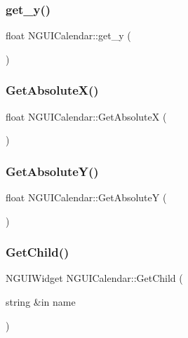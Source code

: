\hypertarget{class_n_g_u_i_calendar_a37957bdc2195ee36b2734cfea183a854}{}\label{class_n_g_u_i_calendar_a37957bdc2195ee36b2734cfea183a854} 
\subsubsection{\texorpdfstring{get\+\_\+y()}{get\_y()}}
{\footnotesize\ttfamily float N\+G\+U\+I\+Calendar\+::get\+\_\+y (\begin{DoxyParamCaption}{ }\end{DoxyParamCaption})}

\hypertarget{class_n_g_u_i_calendar_a7dfbb8437e25e959a1ab7fdf15032823}{}\label{class_n_g_u_i_calendar_a7dfbb8437e25e959a1ab7fdf15032823} 
\subsubsection{\texorpdfstring{Get\+Absolute\+X()}{GetAbsoluteX()}}
{\footnotesize\ttfamily float N\+G\+U\+I\+Calendar\+::\+Get\+AbsoluteX (\begin{DoxyParamCaption}{ }\end{DoxyParamCaption})}

\hypertarget{class_n_g_u_i_calendar_a4f9f1add65e8b5a3a19180b8986ac582}{}\label{class_n_g_u_i_calendar_a4f9f1add65e8b5a3a19180b8986ac582} 
\subsubsection{\texorpdfstring{Get\+Absolute\+Y()}{GetAbsoluteY()}}
{\footnotesize\ttfamily float N\+G\+U\+I\+Calendar\+::\+Get\+AbsoluteY (\begin{DoxyParamCaption}{ }\end{DoxyParamCaption})}

\hypertarget{class_n_g_u_i_calendar_a12b45acbf5be8dd475fa9dc47efb0e5a}{}\label{class_n_g_u_i_calendar_a12b45acbf5be8dd475fa9dc47efb0e5a} 
\subsubsection{\texorpdfstring{Get\+Child()}{GetChild()}\hspace{0.1cm}{\footnotesize\ttfamily [1/2]}}
{\footnotesize\ttfamily N\+G\+U\+I\+Widget N\+G\+U\+I\+Calendar\+::\+Get\+Child (\begin{DoxyParamCaption}\item[{string \&in}]{name }\end{DoxyParamCaption})}

